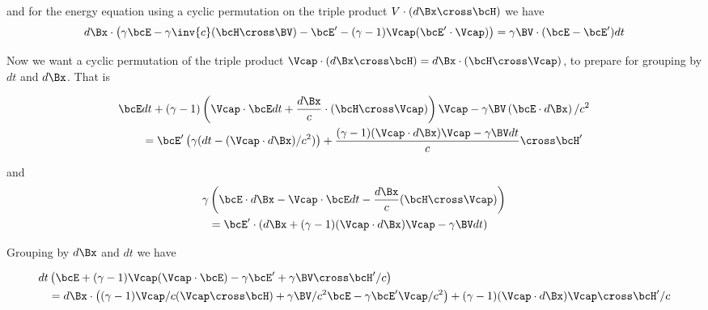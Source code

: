and for the energy equation using a cyclic permutation on the triple product \(V \cdot (d\Bx \cross \bcH)\) we have
\begin{equation}\label{eqn:lorentz_force_tx_2:140}
\begin{aligned}
d\Bx \cdot \left( \gamma \bcE
- \gamma \inv{c} (\bcH \cross \BV)
-\bcE' - (\gamma-1) \Vcap (\bcE' \cdot \Vcap)
\right)
= \gamma \BV \cdot (\bcE -\bcE')dt
\end{aligned}
\end{equation}

Now we want a cyclic permutation of the triple product \(\Vcap \cdot (d\Bx \cross \bcH) = d\Bx \cdot (\bcH \cross \Vcap)\), to prepare for grouping by \(dt\) and \(d\Bx\).  That is

\begin{equation}\label{eqn:lorentz_force_tx_2:160}
\begin{aligned}
\bcE &dt
+ (\gamma-1)\left(
\Vcap \cdot \bcE dt
+\frac{d\Bx}{c} \cdot (\bcH \cross \Vcap)
\right) \Vcap - \gamma \BV \left( \bcE \cdot d\Bx \right)/c^2  \\
&=
\bcE' \left(\gamma ( dt - (\Vcap \cdot d\Bx )/c^2 )\right) + \frac{(\gamma-1)(\Vcap \cdot d\Bx) \Vcap - \gamma \BV dt}{c} \cross \bcH'
\end{aligned}
\end{equation}

and
\begin{equation}\label{eqn:lorentz_force_tx_2:180}
\begin{aligned}
\gamma &\left( \bcE \cdot d\Bx -
\Vcap \cdot \bcE dt
-\frac{d\Bx}{c} (\bcH \cross \Vcap)
\right) \\
&=
\bcE' \cdot \left(d\Bx + (\gamma-1)(\Vcap \cdot d\Bx) \Vcap - \gamma \BV dt\right)
\end{aligned}
\end{equation}

Grouping by \(d\Bx\) and \(dt\) we have

\begin{equation}\label{eqn:lorentz_force_tx_2:200}
\begin{aligned}
dt &\left(
\bcE
+ (\gamma-1) \Vcap (\Vcap \cdot \bcE)
- \gamma \bcE'
+ \gamma \BV \cross \bcH'/c
\right)
\\
&=
d\Bx \cdot \left(
(\gamma-1) \Vcap/c (\Vcap \cross \bcH)
+ \gamma \BV/c^2 \bcE
- \gamma \bcE' \Vcap/c^2
\right)
+ (\gamma-1)(\Vcap \cdot d\Bx) \Vcap \cross \bcH'/c
\end{aligned}
\end{equation}


